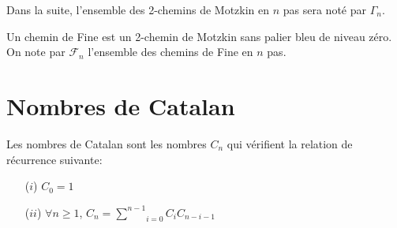 Dans la suite, l'ensemble des 2-chemins de Motzkin en $n$ pas sera noté par $\Gamma_{n}$.
\vspace{5pt}
\begin{definition}
	\begin{rm}
		Un chemin de Fine est un 2-chemin de Motzkin sans palier bleu de niveau zéro. On note par $\mathcal{F}_{n}$ l'ensemble des chemins de Fine en $n$ pas.
	\end{rm}
\end{definition}

\section{Nombres de Catalan}
\begin{definition}
	\begin{rm}
		Les nombres de Catalan sont les nombres $C_{n}$ qui vérifient la relation de récurrence suivante:
		\begin{itemize}
			\item [($i$)] $C_{0}=1$
			\item [($ii$)] $\forall n \geq 1$, $C_{n} = \underset{i=0}{\overset{n-1}{\sum}}C_{i}C_{n-i-1}$
		\end{itemize}
	\end{rm}
\end{definition}

